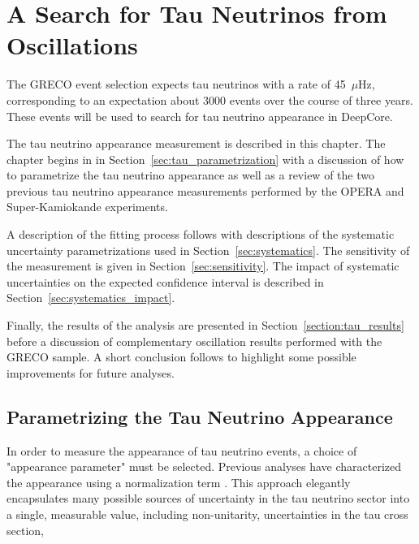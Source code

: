 \graphicspath{{chapters/analysis/images/}}
\chapter{A Search for Tau Neutrinos from Oscillations}



\label{chapter:analysis}
The GRECO event selection expects tau neutrinos with a rate of 45~$\mu$Hz, corresponding to an expectation about 3000 events over the course of three years.
These events will be used to search for tau neutrino appearance in DeepCore.

The tau neutrino appearance measurement is described in this chapter.
The chapter begins in in Section~\ref{sec:tau_parametrization} with a discussion of how to parametrize the tau neutrino appearance as well as a review of the two previous tau neutrino appearance measurements performed by the OPERA and Super-Kamiokande experiments.

A description of the fitting process follows with descriptions of the systematic uncertainty parametrizations used in Section~\ref{sec:systematics}.
The sensitivity of the measurement is given in Section~\ref{sec:sensitivity}.
The impact of systematic uncertainties on the expected confidence interval is described in Section~\ref{sec:systematics_impact}.

Finally, the results of the analysis are presented in Section~\ref{section:tau_results} before a discussion of complementary oscillation results performed with the GRECO sample.
A short conclusion follows to highlight some possible improvements for future analyses.











\label{sec:tau_parametrization}
\section{Parametrizing the Tau Neutrino Appearance}
In order to measure the appearance of tau neutrino events, a choice of "appearance parameter" must be selected.
Previous analyses have characterized the appearance using a normalization term \cite{SuperK-Tau2013,SuperK-Tau2017,OPERA-Tau2015}.
This approach elegantly encapsulates many possible sources of uncertainty in the tau neutrino sector into a single, measurable value, including non-unitarity, uncertainties in the tau cross section, 

